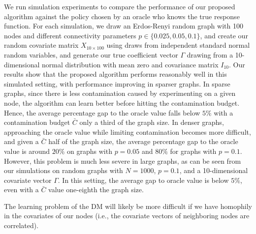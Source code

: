 \documentclass[11pt,a4paper]{article}
\begin{document}


We run simulation experiments to compare the performance of our proposed algorithm against the policy chosen by an oracle who knows the true response function. For each simulation, we draw an Erdos-Renyi random graph with 100 nodes and different connectivity parameters $p \in \{ 0.025, 0.05, 0.1 \}$, and create our random covariate matrix $X_{10 \times 100}$ using draws from independent standard normal random variables, and generate our true coefficient vector $\Gamma$ drawing from a 10-dimensional normal distribution with mean zero and covariance matrix $I_{10}$. Our results show that the proposed algorithm performs reasonably well in this simulated setting, with performance improving in sparser graphs. In sparse graphs, since there is less contamination caused by experimenting on a given node, the algorithm can learn better before hitting the contamination budget. Hence, the average percentage gap to the oracle value falls below $5\%$ with a contamination budget $\bar C$ only a third of the graph size. In denser graphs, approaching the oracle value while limiting contamination becomes more difficult, and given a $\bar C$ half of the graph size, the average percentage gap to the oracle value is around $20\%$ on graphs with $p = 0.05$ and $80 \%$ for graphs with $p=0.1$. However, this problem is much less severe in large graphs, as can be seen from our simulations on random graphs with $N=1000$, $p=0.1$, and a 10-dimensional covariate vector $\Gamma$. In this setting, the average gap to oracle value is below $5 \%$, even with a $\bar C$ value one-eighth the graph size.

The learning problem of the DM will likely be more difficult if we have homophily in the covariates of our nodes (i.e., the covariate vectors of neighboring nodes are correlated). 
\end{document}
